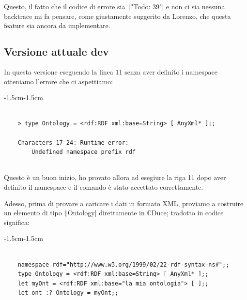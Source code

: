 \documentclass[]{article}
\newcommand{\cduce}{$\mathbb {C}$Duce\xspace}
\begin{document}
Questo, il fatto che il codice di errore sia \texttt|"Todo: 39"| e non ci sia nessuna backtrace mi fa pensare, come giustamente suggerito da Lorenzo, che questa feature sia ancora da implementare.

\subsection{Versione attuale dev}
In questa versione eseguendo la linea 11 senza aver definito i namespace otteniamo l'errore che ci aspettiamo:

\begin{adjustwidth}{-1.5cm}{-1.5cm}	
	\begin{minipage}{\linewidth} 
		\begin{verbatim}
			
	> type Ontology = <rdf:RDF xml:base=String> [ AnyXml* ];;
	
	Characters 17-24: Runtime error:
		Undefined namespace prefix rdf
				
		\end{verbatim}
	\end{minipage}
\end{adjustwidth}

Questo è un buon inizio, ho provato allora ad esegiure la riga 11 dopo aver definito il namespace e il comando è stato accettato correttamente.

Adesso, prima di provare a caricare i dati in formato XML, proviamo a costruire un elemento di tipo \texttt|Ontology| direttamente in \cduce; tradotto in codice significa:

\begin{adjustwidth}{-1.5cm}{-1.5cm}	
	\begin{minipage}{\linewidth} 
		\begin{verbatim}
			
	namespace rdf="http://www.w3.org/1999/02/22-rdf-syntax-ns#";;
	type Ontology = <rdf:RDF xml:base=String> [ AnyXml* ];;
	let myOnt = <rdf:RDF xml:base="la mia ontologia"> [ ];;
	let ont :? Ontology = myOnt;;
			
		\end{verbatim}
	\end{minipage}
\end{adjustwidth}
\end{document}
